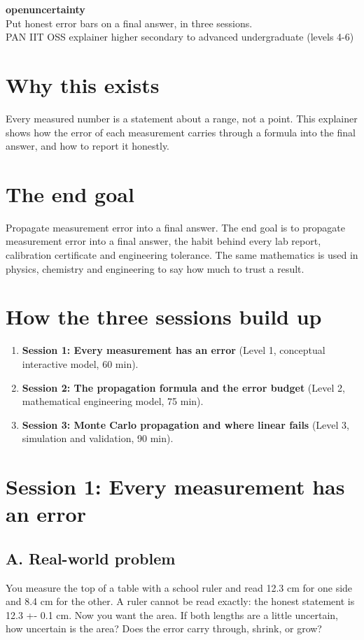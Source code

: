 \documentclass[11pt,a4paper]{article}
\begin{document}
\begin{center}{\LARGE\bfseries openuncertainty}\\[0.4em]{\large Put honest error bars on a final answer, in three sessions.}\\[0.2em]\small PAN IIT OSS explainer \textbullet{} higher secondary to advanced undergraduate (levels 4-6)\end{center}

\section*{Why this exists}
Every measured number is a statement about a range, not a point. This explainer shows how the error of each measurement carries through a formula into the final answer, and how to report it honestly.

\section*{The end goal}
Propagate measurement error into a final answer. The end goal is to propagate measurement error into a final answer, the habit behind every lab report, calibration certificate and engineering tolerance. The same mathematics is used in physics, chemistry and engineering to say how much to trust a result.

\section*{How the three sessions build up}
\begin{enumerate}[nosep]
\item \textbf{Session 1: Every measurement has an error} (Level 1, conceptual interactive model, 60 min).
\item \textbf{Session 2: The propagation formula and the error budget} (Level 2, mathematical engineering model, 75 min).
\item \textbf{Session 3: Monte Carlo propagation and where linear fails} (Level 3, simulation and validation, 90 min).
\end{enumerate}

\section{Session 1: Every measurement has an error}

\subsection*{A. Real-world problem}
You measure the top of a table with a school ruler and read 12.3 cm for one side and 8.4 cm for the other. A ruler cannot be read exactly: the honest statement is 12.3 +- 0.1 cm. Now you want the area. If both lengths are a little uncertain, how uncertain is the area? Does the error carry through, shrink, or grow?
\end{document}
